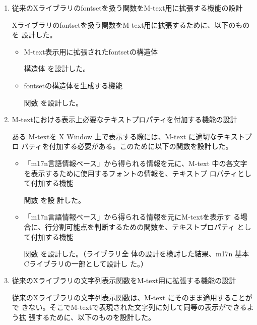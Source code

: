 \begin{enumerate}

\item 従来のXライブラリのfontsetを扱う関数をM-text用に拡張する機能の設計

Xライブラリのfontsetを扱う関数をM-text用に拡張するために、以下のものを
設計した。

     \begin{itemize}
     \item M-text表示用に拡張されたfontsetの構造体\par 
       構造体 を設計した。
     \item fontsetの構造体を生成する機能\par 
       関数 を設計した。
     \end{itemize}
     
\item M-textにおける表示上必要なテキストプロパティを付加する機能の設計

ある M-textを X Window 上で表示する際には、M-text に適切なテキストプロ
パティを付加する必要がある。このために以下の関数を設計した。

     \begin{itemize}
     \item 「m17n言語情報ベース」から得られる情報を元に、M-text
       中の各文字を表示するために使用するフォントの情報を、テキストプ
       ロパティとして付加する機能\par 関数 を設
       計した。

      \item 「m17n言語情報ベース」から得られる情報を元にM-textを表示す
	る場合に、行分割可能点を判断するための関数を、テキストプロパティ
	として付加する機能\par 関数 
	を設計した。（ライブラリ全
	体の設計を検討した結果、m17n 基本Cライブラリの一部として設計し
	た。）

     \end{itemize}
     
\item 従来のXライブラリの文字列表示関数をM-text用に拡張する機能の設計

従来のXライブラリの文字列表示関数は、M-text にそのまま適用することがで
きない。そこでM-textで表現された文字列に対して同等の表示ができるよう拡
張するために、以下のものを設計した。


\end{enumerate}
